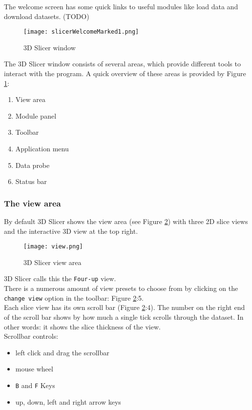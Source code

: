 The welcome screen has some quick links to useful modules like load data and download datasets. (TODO)
\pagebreak
\begin{figure}[h!] %
	\centerline{ %
		\texttt{[image: slicerWelcomeMarked1.png]}}
	\caption{3D Slicer window}
	\label{fig:slicerView}
\end{figure}

\noindent
The 3D Slicer window consists of several areas, which provide different tools to interact with the program.
A quick overview of these areas is provided by Figure \ref{fig:slicerView}:
\begin{enumerate}
	\item View area
	\item Module panel
	\item Toolbar
	\item Application menu
	\item Data probe
	\item Status bar
\end{enumerate}

\pagebreak

\subsubsection{The view area} \label{sec:view_area}
By default 3D Slicer shows the view area (see Figure \ref{fig:4upview}) with three 2D slice views and the interactive 3D view at the top right.\\
\noindent
\begin{figure}[h!] %
	\centerline{ %
		\texttt{[image: view.png]}}
	\caption{3D Slicer view area}
	\label{fig:4upview}
\end{figure}

\noindent
3D Slicer calls this the \texttt{Four-up} view.\\

\noindent
There is a numerous amount of view presets to choose from by clicking on the \texttt{change view} option in the toolbar: Figure \ref{fig:4upview}:5.\\

\noindent
Each slice view has its own scroll bar (Figure \ref{fig:4upview}:4).
The number on the right end of the scroll bar shows by how much a single tick scrolls through the dataset.
In other words: it shows the slice thickness of the view.\\
\noindent
Scrollbar controls:
\begin{itemize}
	\item left click and drag the scrollbar
	\item mouse wheel
	\item \texttt{B} and \texttt{F} Keys
	\item up, down, left and right arrow keys
\end{itemize}

